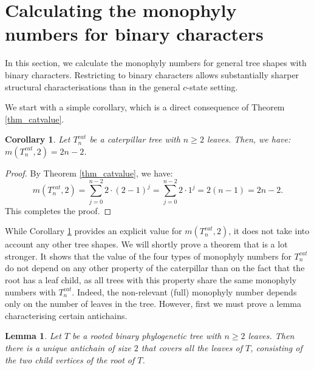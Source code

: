 \documentclass{amsart}
\newtheorem{lemma}[theorem]{Lemma}
\newtheorem{corollary}[theorem]{Corollary}
\theoremstyle{definition}
\begin{document}
\section{Calculating the monophyly numbers for binary characters}\label{s:bincha}
In this section, we calculate the monophyly numbers for general tree shapes with binary characters. Restricting to binary characters allows substantially sharper structural characterisations than in the general $c$-state setting.

We start with a simple corollary, which is a direct consequence of Theorem \ref{thm_catvalue}. 


\begin{corollary} \label{cor_valuecat} Let $T_n^{cat}$ be a caterpillar tree with $n\geq 2$ leaves. Then, we have:  $m(T_n^{cat},2)=2n-2$.  \end{corollary}

\begin{proof} By Theorem \ref{thm_catvalue}, we have: $$m(T_n^{cat},2)=\sum\limits_{j=0}^{n-2}2\cdot(2-1)^{j}= \sum\limits_{j=0}^{n-2}2\cdot 1^{j}=2(n-1)=2n-2.$$ This completes the proof. \end{proof}

While Corollary \ref{cor_valuecat} provides an explicit value for $m(T_n^{cat},2)$, it does not take into account any other tree shapes. We will shortly prove a theorem that is a lot stronger. It shows that the value of the four types of monophyly numbers for $T_n^{cat}$ do not depend on any other property of the caterpillar than on the fact that the root has a leaf child, as all trees with this property share the same monophyly numbers with $T_n^{cat}$. Indeed, the non-relevant (full) monophyly number depends only on the number of leaves in the tree. However, first we must prove a lemma characterising certain antichains.

\begin{lemma}\label{lem_len2anti}
    Let $T$ be a rooted binary phylogenetic tree with $n\geq 2$ leaves. Then there is a unique antichain of size $2$ that covers all the leaves of $T$, consisting of the two child vertices of the root of $T$.
\end{lemma}
\end{document}
